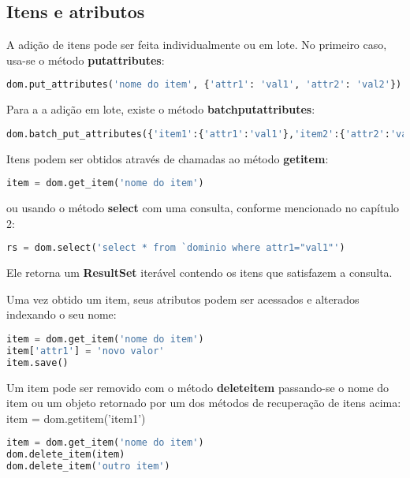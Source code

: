 \subsection{Itens e atributos}
A adição de itens pode ser feita individualmente ou em lote. No primeiro caso, usa-se o método \textbf{put{\textunderscore}attributes}:
\begin{lstlisting}[language=Python]
dom.put_attributes('nome do item', {'attr1': 'val1', 'attr2': 'val2'})
\end{lstlisting}

Para a a adição em lote, existe o método \textbf{batch{\textunderscore}put{\textunderscore}attributes}:
\begin{lstlisting}[language=Python]
dom.batch_put_attributes({'item1':{'attr1':'val1'},'item2':{'attr2':'val2'}})
\end{lstlisting}

Itens podem ser obtidos através de chamadas ao método \textbf{get{\textunderscore}item}:
\begin{lstlisting}[language=Python]
item = dom.get_item('nome do item')
\end{lstlisting}

ou usando o método \textbf{select} com uma consulta, conforme mencionado no capítulo 2:
\begin{lstlisting}[language=Python]
rs = dom.select('select * from `dominio where attr1="val1"')
\end{lstlisting}

Ele retorna um \textbf{ResultSet} iterável contendo os itens que satisfazem a consulta.

Uma vez obtido um item, seus atributos podem ser acessados e alterados indexando o seu nome:
\begin{lstlisting}[language=Python]
item = dom.get_item('nome do item')
item['attr1'] = 'novo valor'
item.save()
\end{lstlisting}

Um item pode ser removido com o método \textbf{delete{\textunderscore}item} passando-se o nome do item ou um objeto retornado por um dos métodos de recuperação de itens acima:
item = dom.get{\textunderscore}item('item1')
\begin{lstlisting}[language=Python]
item = dom.get_item('nome do item')
dom.delete_item(item)
dom.delete_item('outro item')
\end{lstlisting}